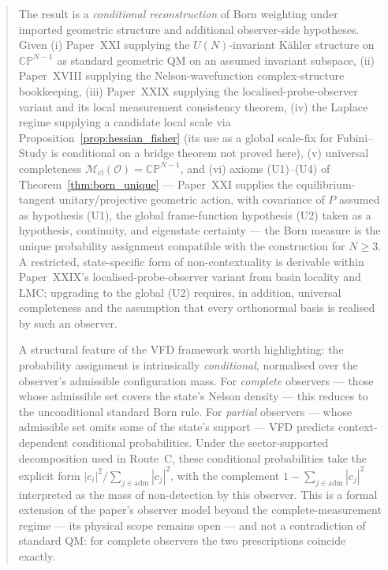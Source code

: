 \documentclass[12pt]{article}
\newcommand{\Ocal}{\mathcal{O}}
\newcommand{\Mcl}{\mathcal{M}_{\mathrm{cl}}}
\begin{document}
\begin{abstract}
The result is a \emph{conditional reconstruction} of Born weighting under imported geometric structure and additional observer-side hypotheses. Given (i) Paper~XXI supplying the $U(N)$-invariant K\"ahler structure on $\mathbb{CP}^{N-1}$ as standard geometric QM on an assumed invariant subspace, (ii) Paper~XVIII supplying the Nelson-wavefunction complex-structure bookkeeping, (iii) Paper~XXIX supplying the localised-probe-observer variant and its local measurement consistency theorem, (iv) the Laplace regime supplying a candidate local scale via Proposition~\ref{prop:hessian_fisher} (its use as a global scale-fix for Fubini--Study is conditional on a bridge theorem not proved here), (v) universal completeness $\Mcl(\Ocal) = \mathbb{CP}^{N-1}$, and (vi) axioms (U1)--(U4) of Theorem~\ref{thm:born_unique} --- Paper~XXI supplies the equilibrium-tangent unitary/projective geometric action, with covariance of $P$ assumed as hypothesis (U1), the global frame-function hypothesis (U2) taken as a hypothesis, continuity, and eigenstate certainty --- the Born measure is the unique probability assignment compatible with the construction for $N \geq 3$. A restricted, state-specific form of non-contextuality is derivable within Paper~XXIX's localised-probe-observer variant from basin locality and LMC; upgrading to the global (U2) requires, in addition, universal completeness and the assumption that every orthonormal basis is realised by such an observer.

A structural feature of the VFD framework worth highlighting: the probability assignment is intrinsically \emph{conditional}, normalised over the observer's admissible configuration mass. For \emph{complete} observers --- those whose admissible set covers the state's Nelson density --- this reduces to the unconditional standard Born rule. For \emph{partial} observers --- whose admissible set omits some of the state's support --- VFD predicts context-dependent conditional probabilities. Under the sector-supported decomposition used in Route~C, these conditional probabilities take the explicit form $|c_i|^2 / \sum_{j \in \mathrm{adm}}|c_j|^2$, with the complement $1 - \sum_{j \in \mathrm{adm}}|c_j|^2$ interpreted as the mass of non-detection by this observer. This is a formal extension of the paper's observer model beyond the complete-measurement regime --- its physical scope remains open --- and not a contradiction of standard QM: for complete observers the two prescriptions coincide exactly.
\end{abstract}
\end{document}
